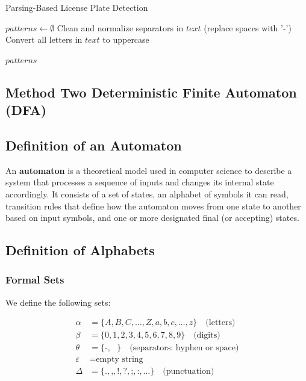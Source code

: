 \documentclass[12pt,a4paper]{article}
\begin{document}
\begin{algorithm}[H]
\caption{Parsing-Based License Plate Detection}

$patterns \gets \emptyset$\;
Clean and normalize separators in $text$ (replace spaces with '-')\;
Convert all letters in $text$ to uppercase\;


\Return $patterns$\;
\end{algorithm}


\subsection{Method Two Deterministic Finite Automaton (DFA)}



\subsection{Definition of an Automaton}

An \textbf{automaton} is a theoretical model used in computer science to describe a system that processes 
a sequence of inputs and changes its internal state accordingly. It consists of a set of states, an 
alphabet of symbols it can read, transition rules that define how the automaton moves from one state 
to another based on input symbols, and one or more designated final (or accepting) states. 

\subsection{Definition of Alphabets}

\subsubsection{Formal Sets}

We define the following sets:

\begin{align}
    \alpha &= \{A, B, C, \ldots, Z, a, b, c, \ldots, z\} \quad \text{(letters)} \\
    \beta &= \{0, 1, 2, 3, 4, 5, 6, 7, 8, 9\} \quad \text{(digits)} \\
    \theta &= \{\text{-}, \text{ }\} \quad \text{(separators: hyphen or space)} \\
    \varepsilon &= \text{empty string} \\
    \Delta &= \{\text{.}, \text{,}, \text{!}, \text{?}, \text{;}, \text{:}, \ldots\} \quad \text{(punctuation)}
\end{align}
\end{document}
